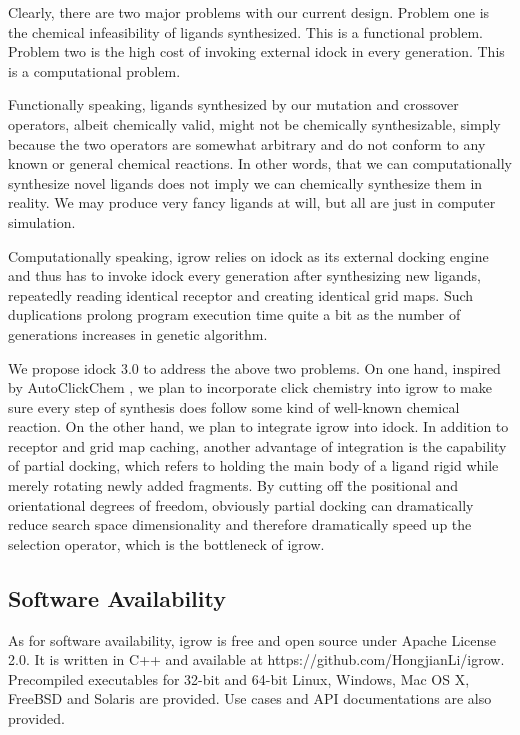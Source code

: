 Clearly, there are two major problems with our current design. Problem one is the chemical infeasibility of ligands synthesized. This is a functional problem. Problem two is the high cost of invoking external idock in every generation. This is a computational problem.

Functionally speaking, ligands synthesized by our mutation and crossover operators, albeit chemically valid, might not be chemically synthesizable, simply because the two operators are somewhat arbitrary and do not conform to any known or general chemical reactions. In other words, that we can computationally synthesize novel ligands does not imply we can chemically synthesize them in reality. We may produce very fancy ligands at will, but all are just in computer simulation.

Computationally speaking, igrow relies on idock as its external docking engine and thus has to invoke idock every generation after synthesizing new ligands, repeatedly reading identical receptor and creating identical grid maps. Such duplications prolong program execution time quite a bit as the number of generations increases in genetic algorithm.

We propose idock 3.0 to address the above two problems. On one hand, inspired by AutoClickChem \citep{1051}, we plan to incorporate click chemistry into igrow to make sure every step of synthesis does follow some kind of well-known chemical reaction. On the other hand, we plan to integrate igrow into idock. In addition to receptor and grid map caching, another advantage of integration is the capability of partial docking, which refers to holding the main body of a ligand rigid while merely rotating newly added fragments. By cutting off the positional and orientational degrees of freedom, obviously partial docking can dramatically reduce search space dimensionality and therefore dramatically speed up the selection operator, which is the bottleneck of igrow.

\subsection{Software Availability}

As for software availability, igrow is free and open source under Apache License 2.0. It is written in C++ and available at https://github.com/HongjianLi/igrow. Precompiled executables for 32-bit and 64-bit Linux, Windows, Mac OS X, FreeBSD and Solaris are provided. Use cases and API documentations are also provided.

